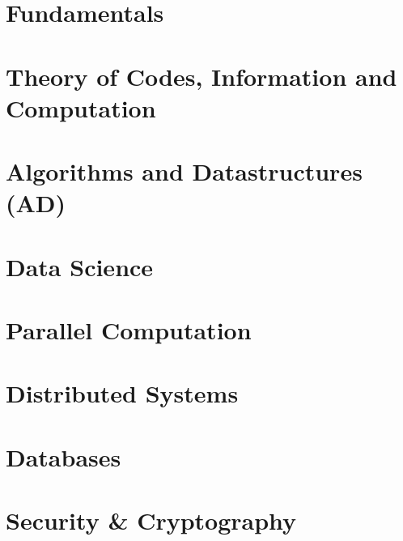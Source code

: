 \documentclass[A4,12pt,twoside]{book}
\begin{document}


\restoregeometry



\part{Fundamentals}



\part{Theory of Codes, Information and Computation}

%
%

\part{Algorithms and Datastructures (AD)}

\part{Data Science}


\part{Parallel Computation}
\part{Distributed Systems}
\part{Databases}
\part{Security \& Cryptography}
\end{document}
